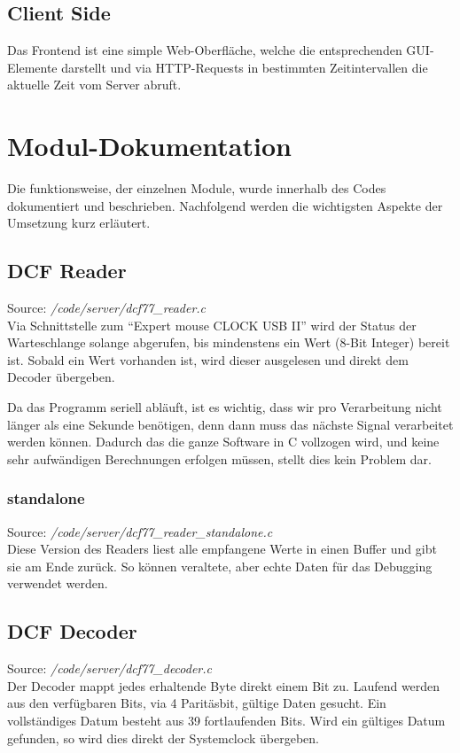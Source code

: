 \subsection{Client Side}
Das Frontend ist eine simple Web-Oberfläche, welche die entsprechenden GUI-Elemente darstellt und via HTTP-Requests in bestimmten Zeitintervallen die aktuelle Zeit vom Server abruft.

\section{Modul-Dokumentation}
Die funktionsweise, der einzelnen Module, wurde innerhalb des Codes dokumentiert und beschrieben. Nachfolgend werden die wichtigsten Aspekte der Umsetzung kurz erläutert.

\subsection{DCF Reader}
Source: \textit{/code/server/dcf77\_reader.c}\\
Via Schnittstelle zum "`Expert mouse CLOCK USB II"' wird der Status der Warteschlange  solange abgerufen, bis mindenstens ein Wert (8-Bit Integer) bereit ist.
Sobald ein Wert vorhanden ist, wird dieser ausgelesen und direkt dem Decoder übergeben.

Da das Programm seriell abläuft, ist es wichtig, dass wir pro Verarbeitung nicht länger als eine Sekunde benötigen, denn dann muss das nächste Signal verarbeitet werden können.
Dadurch das die ganze Software in C vollzogen wird, und keine sehr aufwändigen Berechnungen erfolgen müssen, stellt dies kein Problem dar.

\subsubsection{standalone}
Source: \textit{/code/server/dcf77\_reader\_standalone.c}\\
Diese Version des Readers liest alle empfangene Werte in einen Buffer und gibt sie am Ende zurück. So können veraltete, aber echte Daten für das Debugging verwendet werden.

\subsection{DCF Decoder}
Source: \textit{/code/server/dcf77\_decoder.c}\\
Der Decoder mappt jedes erhaltende Byte direkt einem Bit zu. Laufend werden aus den verfügbaren Bits, via 4 Paritäsbit, gültige Daten gesucht. Ein vollständiges Datum besteht aus 39 fortlaufenden Bits.
Wird ein gültiges Datum gefunden, so wird dies direkt der Systemclock übergeben.


